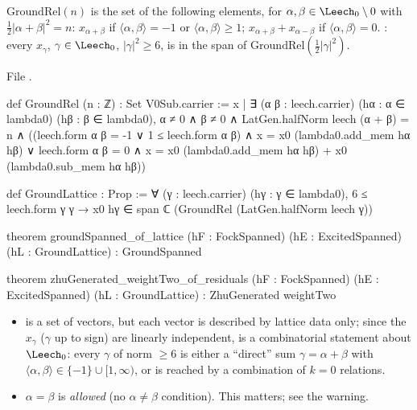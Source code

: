 \begin{definition}\label{ch12:def:GroundRel}
$\mathrm{GroundRel}(n)$ is the set of the following elements, for $\alpha,\beta\in\Leech_0\setminus0$
with $\tfrac12|\alpha+\beta|^2=n$: $x_{\alpha+\beta}$ if $\langle\alpha,\beta\rangle=-1$ or
$\langle\alpha,\beta\rangle\ge1$; $x_{\alpha+\beta}+x_{\alpha-\beta}$ if $\langle\alpha,\beta\rangle=0$.
: every $x_\gamma$, $\gamma\in\Leech_0$, $|\gamma|^2\ge6$, is in the span of
$\mathrm{GroundRel}(\tfrac12|\gamma|^2)$.
\end{definition}
File .
\begin{leancode}
def GroundRel (n : ℤ) : Set V0Sub.carrier :=
  {x | ∃ (α β : leech.carrier) (hα : α ∈ lambda0) (hβ : β ∈ lambda0), α ≠ 0 ∧ β ≠ 0 ∧
      LatGen.halfNorm leech (α + β) = n ∧
      ((leech.form α β = -1 ∨ 1 ≤ leech.form α β) ∧ x = x0 (lambda0.add_mem hα hβ) ∨
        leech.form α β = 0 ∧ x = x0 (lambda0.add_mem hα hβ) + x0 (lambda0.sub_mem hα hβ))}

def GroundLattice : Prop :=
  ∀ (γ : leech.carrier) (hγ : γ ∈ lambda0), 6 ≤ leech.form γ γ →
    x0 hγ ∈ span ℂ (GroundRel (LatGen.halfNorm leech γ))

theorem groundSpanned_of_lattice (hF : FockSpanned) (hE : ExcitedSpanned) (hL : GroundLattice) :
    GroundSpanned

theorem zhuGenerated_weightTwo_of_residuals (hF : FockSpanned) (hE : ExcitedSpanned)
    (hL : GroundLattice) : ZhuGenerated weightTwo
\end{leancode}
\begin{dictionary}
\begin{itemize}
\item {} is a set of vectors, but each vector is described by lattice data only; since
  the $x_\gamma$ ($\gamma$ up to sign) are linearly independent,  is a combinatorial
  statement about $\Leech_0$: every $\gamma$ of norm $\ge6$ is either a ``direct'' sum
  $\gamma=\alpha+\beta$ with $\langle\alpha,\beta\rangle\in\{-1\}\cup[1,\infty)$, or is reached by a
  combination of $k=0$ relations.
\item $\alpha=\beta$ is \emph{allowed} (no $\alpha\neq\beta$ condition).  This matters; see the warning.
\end{itemize}
\end{dictionary}

